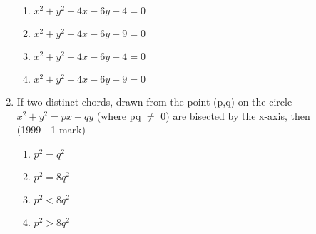 \documentclass[journal,12pt,twocolumn]{IEEEtran}
\theoremstyle{remark}
\begin{document}
\begin{enumerate}[label=\arabic*.]
\begin{enumerate}[label=(\alph*)]
    \item $x^{2}+y^{2}+4x-6y+4=0$
    \item $x^{2}+y^{2}+4x-6y-9=0$
    \item $x^{2}+y^{2}+4x-6y-4=0$
    \item $x^{2}+y^{2}+4x-6y+9=0$
    \end{enumerate}
    \item If two distinct chords, drawn from the point (p,q) on the circle $x^{2}+y^{2}=px+qy$ (where pq $\neq$ 0) are bisected by the x-axis, then\\
    \hspace*{2in} {(1999 - 1 mark)}
    \begin{enumerate}[label=(\alph*)]
    \item $p^{2}=q^{2}$
    \item $p^{2}=8q^{2}$ 
    \item $p^{2}<8q^{2}$
    \item $p^{2}>8q^{2}$
    \end{enumerate}
    
\end{enumerate}
\end{document}
